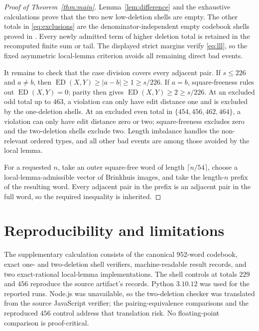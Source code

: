 \documentclass[11pt]{article}
\newcommand{\ED}{\operatorname{ED}}
\begin{document}
\begin{proof}[Proof of Theorem~\ref{thm:main}]
Lemma~\ref{lem:difference} and the exhaustive calculations prove that the two
new low-deletion shells are empty.  The other totals in
\eqref{eq:exclusions} are the denominator-independent empty codebook shells
proved in \cite[Appendix D]{XuEtAl2026}.  Every newly admitted term of higher
deletion total is retained in the recomputed finite sum or tail.  The displayed
strict margins verify \eqref{eq:lll}, so the fixed asymmetric local-lemma
criterion avoids all remaining direct bad events.

It remains to check that the case division covers every adjacent pair.  If
$s\leq226$ and $a\ne b$, then
$\ED(X,Y)\geq|a-b|\geq1\geq s/226$.  If $a=b$, square-freeness rules out
$\ED(X,Y)=0$; parity then gives $\ED(X,Y)\geq2\geq s/226$.  At an excluded
odd total up to $463$, a violation can only have edit distance one and is
excluded by the one-deletion shells.  At an excluded even total in
$\{454,456,462,464\}$, a violation can only have edit distance zero or two;
square-freeness excludes zero and the two-deletion shells exclude two.  Length
imbalance handles the non-relevant ordered types, and all other bad events are
among those avoided by the local lemma.

For a requested $n$, take an outer square-free word of length
$\lceil n/54\rceil$, choose a local-lemma-admissible vector of Brinkhuis
images, and take the length-$n$ prefix of the resulting word.  Every adjacent
pair in the prefix is an adjacent pair in the full word, so the required
inequality is inherited.
\end{proof}

\section{Reproducibility and limitations}

The supplementary calculation consists of the canonical $952$-word codebook,
exact one- and two-deletion shell verifiers, machine-readable result records,
and two exact-rational local-lemma implementations.  The shell controls at
totals $229$ and $456$ reproduce the source artifact's records.  Python
$3.10.12$ was used for the reported runs.  Node.js was unavailable, so the
two-deletion checker was translated from the source JavaScript verifier; the
pairing-equivalence comparisons and the reproduced $456$ control address that
translation risk.  No floating-point comparison is proof-critical.
\end{document}
